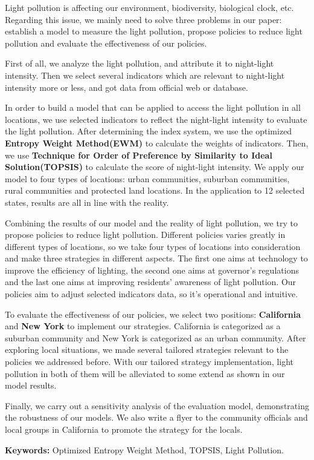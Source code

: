 \MinParskip{}

Light pollution is affecting our environment, biodiversity, biological clock, etc. Regarding this issue, we mainly need to solve three problems in our paper: establish a model to measure the light pollution, propose policies to reduce light pollution and evaluate the effectiveness of our policies. 

First of all, we analyze the light pollution, and attribute it to night-light intensity. Then we select several indicators which are relevant to night-light intensity more or less, and got data from official web or database.

In order to build a model that can be applied to access the light pollution in all locations, we use selected indicators to reflect the night-light intensity to evaluate the light pollution. After determining the index system, we use the optimized \textbf{Entropy Weight Method(EWM)} to calculate the weights of indicators. Then, we use \textbf{Technique for Order of Preference by Similarity to Ideal Solution(TOPSIS)} to calculate the score of night-light intensity. We apply our model to four types of locations: urban communities, suburban communities, rural communities and protected land locations. In the application to 12 selected states, results are all in line with the reality.

Combining the results of our model and the reality of light pollution, we try to propose policies to reduce light pollution. Different policies varies greatly in different types of locations, so we take four types of locations into consideration and make three strategies in different aspects. The first one aims at technology to improve the efficiency of lighting, the second one aims at governor's regulations and the last one aims at improving residents' awareness of light pollution. Our policies aim to adjust selected indicators data, so it's operational and intuitive. 

To evaluate the effectiveness of our policies, we select two positions: \textbf{California} and \textbf{New York} to implement our strategies. California is categorized as a suburban community and New York is categorized as an urban community. After exploring local situations, we made several tailored strategies relevant to the policies we addressed before. With our tailored strategy implementation, light pollution in both of them will be alleviated to some extend as shown in our model results.

Finally, we carry out a sensitivity analysis of the evaluation model, demonstrating the robustness of our models. We also write a flyer to the community officials and local groups in California to promote the strategy for the locals.


\textbf{Keywords:} Optimized Entropy Weight Method, TOPSIS, Light Pollution.